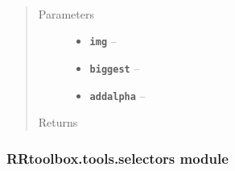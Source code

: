 \documentclass[letterpaper,10pt,english]{sphinxmanual}
\begin{document}

\begin{fulllineitems}
\label{RRtoolbox.tools:RRtoolbox.tools.segmentation.retinal_mask}~\begin{quote}\begin{description}
\item[{Parameters}] \leavevmode\begin{itemize}
\item {} 
\textbf{\texttt{img}} -- 

\item {} 
\textbf{\texttt{biggest}} -- 

\item {} 
\textbf{\texttt{addalpha}} -- 

\end{itemize}

\item[{Returns}] \leavevmode


\end{description}\end{quote}

\end{fulllineitems}


\begin{fulllineitems}
\label{RRtoolbox.tools:RRtoolbox.tools.segmentation.retinal_mask_simple}
\end{fulllineitems}



\subsubsection{RRtoolbox.tools.selectors module}
\label{RRtoolbox.tools:module-RRtoolbox.tools.selectors}\label{RRtoolbox.tools:rrtoolbox-tools-selectors-module}
\end{document}
